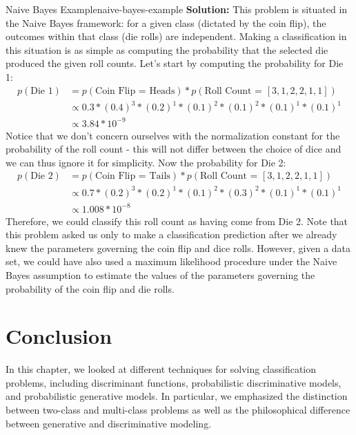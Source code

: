 \begin{example}{Naive Bayes Example}{naive-bayes-example}
	\textbf{Solution:} \newline
	This problem is situated in the Naive Bayes framework: for a given class (dictated by the coin flip), the outcomes within that class (die rolls) are independent. Making a classification in this situation is as simple as computing the probability that the selected die produced the given roll counts. Let's start by computing the probability for Die 1:
	\begin{align*}
		p(\text{Die 1}) &= p(\text{Coin Flip = Heads}) * p(\text{Roll Count = }[3,1,2,2,1,1]) \\
		&\propto 0.3 * (0.4)^{3} * (0.2)^{1} * (0.1)^{2} * (0.1)^{2} * (0.1)^{1} * (0.1)^{1} \\
		&\propto 3.84 * 10^{-9}
	\end{align*}
	Notice that we don't concern ourselves with the normalization constant for the probability of the roll count - this will not differ between the choice of dice and we can thus ignore it for simplicity. Now the probability for Die 2:
	\begin{align*}
		p(\text{Die 2}) &= p(\text{Coin Flip = Tails}) * p(\text{Roll Count = }[3,1,2,2,1,1]) \\
		&\propto 0.7 * (0.2)^{3} * (0.2)^{1} * (0.1)^{2} * (0.3)^{2} * (0.1)^{1} * (0.1)^{1} \\
		&\propto 1.008 * 10^{-8}
	\end{align*}
	Therefore, we could classify this roll count as having come from Die 2. \newline \newline
	Note that this problem asked us only to make a classification prediction after we already knew the parameters governing the coin flip and dice rolls. However, given a data set, we could have also used a maximum likelihood procedure under the Naive Bayes assumption to estimate the values of the parameters governing the probability of the coin flip and die rolls.
\end{example}

\section{Conclusion}
In this chapter, we looked at different techniques for solving classification problems, including discriminant functions, probabilistic discriminative models, and probabilistic generative models. In particular, we emphasized the distinction between two-class and multi-class problems as well as the philosophical difference between generative and discriminative modeling.

